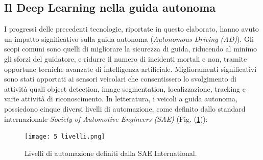 \subsection{Il Deep Learning nella guida autonoma}
I progressi delle precedenti tecnologie, riportate in questo elaborato, hanno 
avuto un impatto significativo sulla guida autonoma (\emph{Autonomous Driving 
(AD)}). Gli scopi comuni sono quelli di migliorare la sicurezza di guida, 
riducendo al minimo gli sforzi del guidatore, e ridurre il numero di incidenti 
mortali e non, tramite opportune tecniche avanzate di intelligenza artificiale. 
Miglioramenti significativi sono stati apportati ai sensori veicolari 
che consentissero lo svolgimento di attività quali object detection, image 
segmentation, localizzazione, tracking e varie attività di riconoscimento. 
In letteratura, i veicoli a guida autonoma, possiedono cinque diversi livelli 
di automazione, come definito dallo standard internazionale \emph{Society of 
Automotive Engineers (SAE)} (Fig. (\ref{sae})):
\begin{figure}
    \centering
    \texttt{[image: 5 livelli.png]}
    \centering
    \caption{Livelli di automazione definiti dalla SAE International.}
    \label{sae}
\end{figure}
